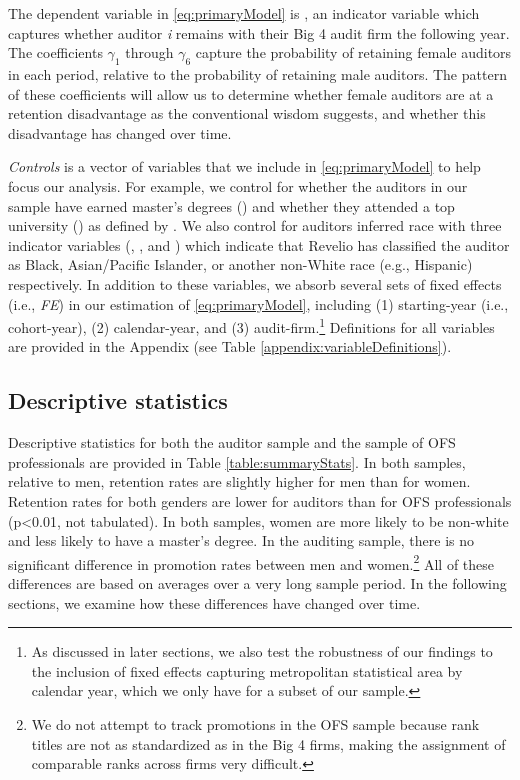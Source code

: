 \documentclass[11pt]{article}
\begin{document}
        The dependent variable in \ref{eq:primaryModel} is \RETAINED, an indicator variable which captures whether auditor \textit{i} remains with their Big 4 audit firm the following year. The coefficients $\gamma_1$ through $\gamma_6$ capture the probability of retaining female auditors in each period, relative to the probability of retaining male auditors. The pattern of these coefficients will allow us to determine whether female auditors are at a retention disadvantage as the conventional wisdom suggests, and whether this disadvantage has changed over time.

        \textit{Controls} is a vector of variables that we include in \ref{eq:primaryModel} to help focus our analysis. For example, we control for whether the auditors in our sample have earned master's degrees (\MASTERS) and whether they attended a top university (\TOPUNIV) as defined by \textcite{FGH2022}. We also control for auditors inferred race with three indicator variables (\BLACKRACE, \APIRACE, and \OTHERRACE) which indicate that Revelio has classified the auditor as Black, Asian/Pacific Islander, or another non-White race (e.g., Hispanic) respectively. In addition to these variables, we absorb several sets of fixed effects (i.e., \textit{FE}) in our estimation of \ref{eq:primaryModel}, including (1) starting-year (i.e., cohort-year), (2) calendar-year, and (3) audit-firm.\footnote{As discussed in later sections, we also test the robustness of our findings to the inclusion of fixed effects capturing metropolitan statistical area by calendar year, which we only have for a subset of our sample.} Definitions for all variables are provided in the Appendix (see Table \ref{appendix:variableDefinitions}).

    \subsection{Descriptive statistics}\label{section:descriptiveStatistics}
        Descriptive statistics for both the auditor sample and the sample of OFS professionals are provided in Table \ref{table:summaryStats}. In both samples, relative to men, retention rates are slightly higher for men than for women. Retention rates for both genders are lower for auditors than for OFS professionals (p<0.01, not tabulated). In both samples, women are more likely to be non-white and less likely to have a master's degree. In the auditing sample, there is no significant difference in promotion rates between men and women.\footnote{We do not attempt to track promotions in the OFS sample because rank titles are not as standardized as in the Big 4 firms, making the assignment of comparable ranks across firms very difficult.} All of these differences are based on averages over a very long sample period. In the following sections, we examine how these differences have changed over time.
\end{document}

